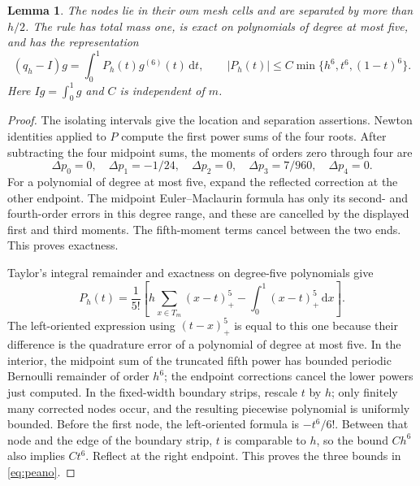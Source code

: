 \documentclass[11pt,a4paper]{article}
\newtheorem{lemma}[theorem]{Lemma}
\theoremstyle{definition}
\newcommand{\dd}{\,\mathrm d}
\newcommand{\abs}[1]{\lvert#1\rvert}
\numberwithin{equation}{section}
\begin{document}
\begin{lemma}\label{lem:peano}
The nodes lie in their own mesh cells and are separated by more than $h/2$. The rule has total mass one, is exact on polynomials of degree at most five, and has the representation
\begin{equation}\label{eq:peano}
 (q_h-I)g=\int_0^1P_h(t)g^{(6)}(t)\dd t,\qquad
 \abs{P_h(t)}\le C\min\{h^6,t^6,(1-t)^6\}.
\end{equation}
Here $I g=\int_0^1g$ and $C$ is independent of $m$.
\end{lemma}
\begin{proof}
The isolating intervals give the location and separation assertions. Newton identities applied to $P$ compute the first power sums of the four roots. After subtracting the four midpoint sums, the moments of orders zero through four are
\begin{equation}
 \Delta p_0=0,\quad \Delta p_1=-1/24,\quad
 \Delta p_2=0,\quad \Delta p_3=7/960,\quad \Delta p_4=0.
\end{equation}
For a polynomial of degree at most five, expand the reflected correction at the other endpoint. The midpoint Euler--Maclaurin formula has only its second- and fourth-order errors in this degree range, and these are cancelled by the displayed first and third moments. The fifth-moment terms cancel between the two ends. This proves exactness.

Taylor's integral remainder and exactness on degree-five polynomials give
\begin{equation}
 P_h(t)=\frac1{5!}\left[h\sum_{x\in T_m}(x-t)_+^5
                         -\int_0^1(x-t)_+^5\dd x\right].
\end{equation}
The left-oriented expression using $(t-x)_+^5$ is equal to this one because their difference is the quadrature error of a polynomial of degree at most five. In the interior, the midpoint sum of the truncated fifth power has bounded periodic Bernoulli remainder of order $h^6$; the endpoint corrections cancel the lower powers just computed. In the fixed-width boundary strips, rescale $t$ by $h$; only finitely many corrected nodes occur, and the resulting piecewise polynomial is uniformly bounded. Before the first node, the left-oriented formula is $-t^6/6!$. Between that node and the edge of the boundary strip, $t$ is comparable to $h$, so the bound $Ch^6$ also implies $Ct^6$. Reflect at the right endpoint. This proves the three bounds in \eqref{eq:peano}.
\end{proof}
\end{document}
